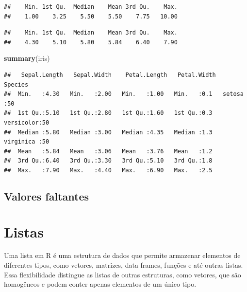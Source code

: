 \documentclass[
]{book}
\newenvironment{Shaded}{\begin{snugshade}}{\end{snugshade}}
\newcommand{\FunctionTok}[1]{\textcolor[rgb]{0.13,0.29,0.53}{\textbf{#1}}}
\newcommand{\NormalTok}[1]{#1}
\newcommand{\SpecialCharTok}[1]{\textcolor[rgb]{0.81,0.36,0.00}{\textbf{#1}}}
\theoremstyle{definition}
\theoremstyle{definition}
\theoremstyle{definition}
\theoremstyle{definition}
\theoremstyle{remark}
\begin{document}
\begin{verbatim}
##    Min. 1st Qu.  Median    Mean 3rd Qu.    Max. 
##    1.00    3.25    5.50    5.50    7.75   10.00
\end{verbatim}

\begin{Shaded}
\end{Shaded}

\begin{verbatim}
##    Min. 1st Qu.  Median    Mean 3rd Qu.    Max. 
##    4.30    5.10    5.80    5.84    6.40    7.90
\end{verbatim}

\begin{Shaded}
\begin{Highlighting}[]
\FunctionTok{summary}\NormalTok{(iris)  }
\end{Highlighting}
\end{Shaded}

\begin{verbatim}
##   Sepal.Length   Sepal.Width    Petal.Length   Petal.Width        Species  
##  Min.   :4.30   Min.   :2.00   Min.   :1.00   Min.   :0.1   setosa    :50  
##  1st Qu.:5.10   1st Qu.:2.80   1st Qu.:1.60   1st Qu.:0.3   versicolor:50  
##  Median :5.80   Median :3.00   Median :4.35   Median :1.3   virginica :50  
##  Mean   :5.84   Mean   :3.06   Mean   :3.76   Mean   :1.2                  
##  3rd Qu.:6.40   3rd Qu.:3.30   3rd Qu.:5.10   3rd Qu.:1.8                  
##  Max.   :7.90   Max.   :4.40   Max.   :6.90   Max.   :2.5
\end{verbatim}

\section{Valores faltantes}\label{valores-faltantes}

\chapter{Listas}\label{listas}

Uma lista em R é uma estrutura de dados que permite armazenar elementos de diferentes tipos, como vetores, matrizes, data frames, funções e até outras listas. Essa flexibilidade distingue as listas de outras estruturas, como vetores, que são homogêneos e podem conter apenas elementos de um único tipo.
\end{document}
